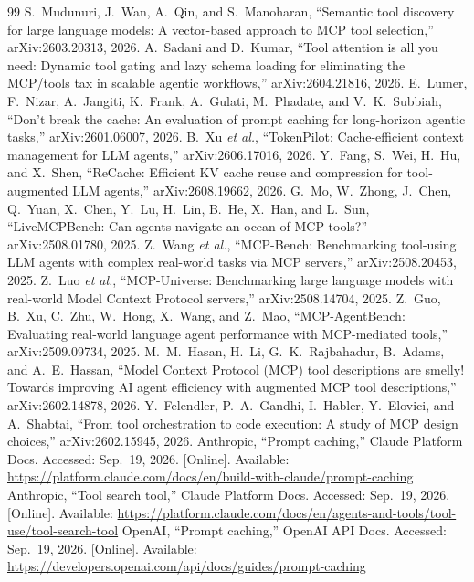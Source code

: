 \documentclass[11pt]{article}
\begin{document}
\begin{thebibliography}{99}
 S.~Mudunuri, J.~Wan, A.~Qin, and S.~Manoharan, ``Semantic tool discovery for large language models: A vector-based approach to MCP tool selection,'' arXiv:2603.20313, 2026.
 A.~Sadani and D.~Kumar, ``Tool attention is all you need: Dynamic tool gating and lazy schema loading for eliminating the MCP/tools tax in scalable agentic workflows,'' arXiv:2604.21816, 2026.
 E.~Lumer, F.~Nizar, A.~Jangiti, K.~Frank, A.~Gulati, M.~Phadate, and V.~K.~Subbiah, ``Don't break the cache: An evaluation of prompt caching for long-horizon agentic tasks,'' arXiv:2601.06007, 2026.
 B.~Xu \emph{et al.}, ``TokenPilot: Cache-efficient context management for LLM agents,'' arXiv:2606.17016, 2026.
 Y.~Fang, S.~Wei, H.~Hu, and X.~Shen, ``ReCache: Efficient KV cache reuse and compression for tool-augmented LLM agents,'' arXiv:2608.19662, 2026.
 G.~Mo, W.~Zhong, J.~Chen, Q.~Yuan, X.~Chen, Y.~Lu, H.~Lin, B.~He, X.~Han, and L.~Sun, ``LiveMCPBench: Can agents navigate an ocean of MCP tools?'' arXiv:2508.01780, 2025.
 Z.~Wang \emph{et al.}, ``MCP-Bench: Benchmarking tool-using LLM agents with complex real-world tasks via MCP servers,'' arXiv:2508.20453, 2025.
 Z.~Luo \emph{et al.}, ``MCP-Universe: Benchmarking large language models with real-world Model Context Protocol servers,'' arXiv:2508.14704, 2025.
 Z.~Guo, B.~Xu, C.~Zhu, W.~Hong, X.~Wang, and Z.~Mao, ``MCP-AgentBench: Evaluating real-world language agent performance with MCP-mediated tools,'' arXiv:2509.09734, 2025.
 M.~M.~Hasan, H.~Li, G.~K.~Rajbahadur, B.~Adams, and A.~E.~Hassan, ``Model Context Protocol (MCP) tool descriptions are smelly! Towards improving AI agent efficiency with augmented MCP tool descriptions,'' arXiv:2602.14878, 2026.
 Y.~Felendler, P.~A.~Gandhi, I.~Habler, Y.~Elovici, and A.~Shabtai, ``From tool orchestration to code execution: A study of MCP design choices,'' arXiv:2602.15945, 2026.
 Anthropic, ``Prompt caching,'' Claude Platform Docs. Accessed: Sep.\ 19, 2026. [Online]. Available: \url{https://platform.claude.com/docs/en/build-with-claude/prompt-caching}
 Anthropic, ``Tool search tool,'' Claude Platform Docs. Accessed: Sep.\ 19, 2026. [Online]. Available: \url{https://platform.claude.com/docs/en/agents-and-tools/tool-use/tool-search-tool}
 OpenAI, ``Prompt caching,'' OpenAI API Docs. Accessed: Sep.\ 19, 2026. [Online]. Available: \url{https://developers.openai.com/api/docs/guides/prompt-caching}

\end{thebibliography}
\end{document}
